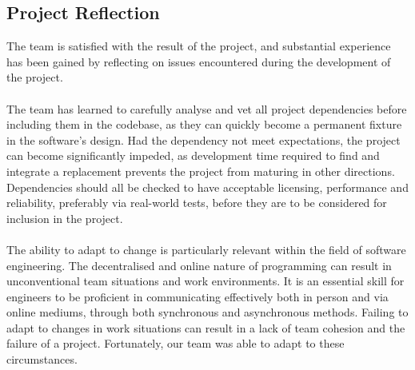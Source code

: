 \documentclass{article}
\begin{document}
\subsection{Project Reflection}
The team is satisfied with the result of the project, and substantial
experience has been gained by reflecting on issues encountered during the
development of the project.\\\\
The team has learned to carefully analyse and vet all project dependencies
before including them in the codebase, as they can quickly become a permanent
fixture in the software's design. Had the dependency not meet expectations,
the project can become significantly impeded, as development time required
to find and integrate a replacement prevents the project from maturing in
other directions. Dependencies should all be checked to have acceptable
licensing, performance and reliability, preferably via real-world tests, before
they are to be considered for inclusion in the project.\\\\
The ability to adapt to change is particularly relevant within the field of
software engineering. The decentralised and online nature of programming can
result in unconventional team situations and work environments.
It is an essential skill for engineers to be proficient in communicating
effectively both in person and via online mediums, through both synchronous and
asynchronous methods. Failing to adapt to changes in work situations can result
in a lack of team cohesion and the failure of a project. Fortunately, our team
was able to adapt to these circumstances.
\end{document}
